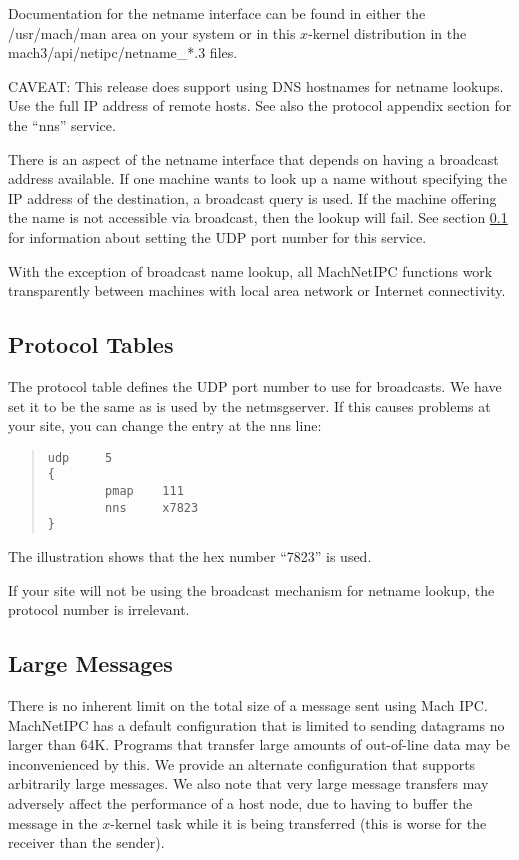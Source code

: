 Documentation for the netname interface can be found in either the
/usr/mach/man area on your system or in this $x$\/-kernel distribution
in the {\sanss mach3/api/netipc/netname\_*.3} files.

CAVEAT: This release does support using DNS hostnames for netname lookups.
Use the full IP address of remote hosts.  See also the protocol
appendix section for the ``nns'' service.

There is an aspect of the netname interface that depends on having
a broadcast address available.  If one machine wants to look up
a name without specifying the IP address of the destination, a
broadcast query is used.  If the machine offering the name is not
accessible via broadcast, then the lookup will fail.  See section
\ref{mniptbl} for information about setting the UDP port number for
this service.

With the exception of broadcast name lookup, all MachNetIPC functions
work transparently between machines with local area network or
Internet connectivity.

\subsection{Protocol Tables}
\label{mniptbl}

The protocol table defines the UDP port number to use for broadcasts.
We have set it to be the same as is used by the netmsgserver.  If this
causes problems at your site, you can change the entry at the nns
line:

\begin{quote}
\begin{verbatim}
udp     5
{
        pmap    111
        nns     x7823
}
\end{verbatim}
\end{quote}

The illustration shows that the hex number ``7823'' is used.

If your site will not be using the broadcast mechanism for netname
lookup, the protocol number is irrelevant.


\subsection{Large Messages}

There is no inherent limit on the total size of a message sent using
Mach IPC.  MachNetIPC has a default configuration that is limited
to sending datagrams no larger than 64K.  Programs that transfer large
amounts of out-of-line data may be inconvenienced by this.  We provide
an alternate configuration that supports arbitrarily large messages.
We also note that very large message transfers may adversely affect
the performance of a host node, due to having to buffer the message
in the $x$\/-kernel task while it is being transferred (this is worse for
the receiver than the sender).

